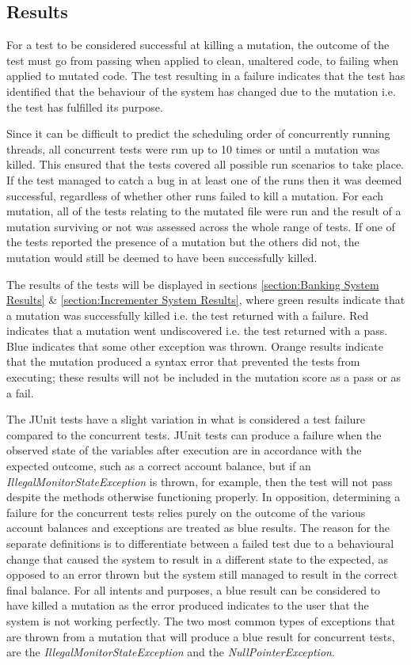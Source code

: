 \documentclass[a4paper,12pt]{article}
\begin{document}
\subsection{Results}

For a test to be considered successful at killing a mutation, the outcome of the test must go from passing when applied to clean, unaltered code, to failing when applied to mutated code. The test resulting in a failure indicates that the test has identified that the behaviour of the system has changed due to the mutation i.e. the test has fulfilled its purpose. 

Since it can be difficult to predict the scheduling order of concurrently running threads, all concurrent tests were run up to 10 times or until a mutation was killed. This ensured that the tests covered all possible run scenarios to take place. If the test managed to catch a bug in at least one of the runs then it was deemed successful, regardless of whether other runs failed to kill a mutation. For each mutation, all of the tests relating to the mutated file were run and the result of a mutation surviving or not was assessed across the whole range of tests. If one of the tests reported the presence of a mutation but the others did not, the mutation would still be deemed to have been successfully killed.

The results of the tests will be displayed in sections \ref{section:Banking System Results} \& \ref{section:Incrementer System Results}, where green results indicate that a mutation was successfully killed i.e. the test returned with a failure. Red indicates that a mutation went undiscovered i.e. the test returned with a pass. Blue indicates that some other exception was thrown. Orange results indicate that the mutation produced a syntax error that prevented the tests from executing; these results will not be included in the mutation score as a pass or as a fail. 

The JUnit tests have a slight variation in what is considered a test failure compared to the concurrent tests. JUnit tests can produce a failure when the observed state of the variables after execution are in accordance with the expected outcome, such as a correct account balance, but if an \textit{IllegalMonitorStateException} is thrown, for example, then the test will not pass despite the methods otherwise functioning properly. In opposition, determining a failure for the concurrent tests relies purely on the outcome of the various account balances and exceptions are treated as blue results. The reason for the separate definitions is to differentiate between a failed test due to a behavioural change that caused the system to result in a different state to the expected, as opposed to an error thrown but the system still managed to result in the correct final balance. For all intents and purposes, a blue result can be considered to have killed a mutation as the error produced indicates to the user that the system is not working perfectly. 
The two most common types of exceptions that are thrown from a mutation that will produce a blue result for concurrent tests, are the \textit{IllegalMonitorStateException} and the \textit{NullPointerException}. 
\end{document}
